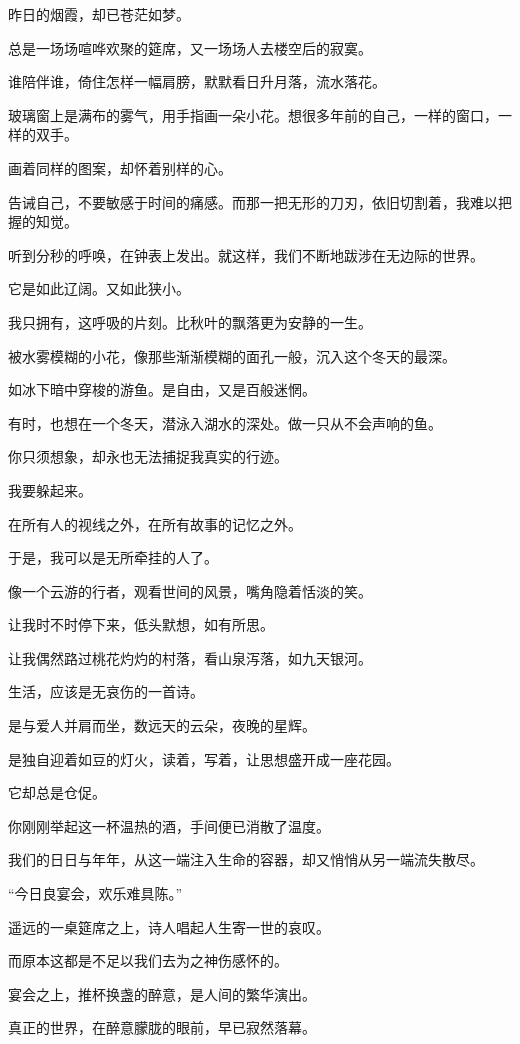 \documentclass[12pt,a4paper]{article}
\begin{document}
		昨日的烟霞，却已苍茫如梦。

		总是一场场喧哗欢聚的筵席，又一场场人去楼空后的寂寞。\par
		谁陪伴谁，倚住怎样一幅肩膀，默默看日升月落，流水落花。

		玻璃窗上是满布的雾气，用手指画一朵小花。想很多年前的自己，一样的窗口，一样的双手。\par
		画着同样的图案，却怀着别样的心。\par
		告诫自己，不要敏感于时间的痛感。而那一把无形的刀刃，依旧切割着，我难以把握的知觉。\par
		听到分秒的呼唤，在钟表上发出。就这样，我们不断地跋涉在无边际的世界。\par
		它是如此辽阔。又如此狭小。\par
		我只拥有，这呼吸的片刻。比秋叶的飘落更为安静的一生。

		被水雾模糊的小花，像那些渐渐模糊的面孔一般，沉入这个冬天的最深。\par
		如冰下暗中穿梭的游鱼。是自由，又是百般迷惘。\par
		有时，也想在一个冬天，潜泳入湖水的深处。做一只从不会声响的鱼。\par
		你只须想象，却永也无法捕捉我真实的行迹。\par
		我要躲起来。\par
		在所有人的视线之外，在所有故事的记忆之外。

		于是，我可以是无所牵挂的人了。

		像一个云游的行者，观看世间的风景，嘴角隐着恬淡的笑。\par
		让我时不时停下来，低头默想，如有所思。\par
		让我偶然路过桃花灼灼的村落，看山泉泻落，如九天银河。

		生活，应该是无哀伤的一首诗。\par
		是与爱人并肩而坐，数远天的云朵，夜晚的星辉。\par
		是独自迎着如豆的灯火，读着，写着，让思想盛开成一座花园。\par
		它却总是仓促。\par
		你刚刚举起这一杯温热的酒，手间便已消散了温度。\par
		我们的日日与年年，从这一端注入生命的容器，却又悄悄从另一端流失散尽。

		“今日良宴会，欢乐难具陈。”

		遥远的一桌筵席之上，诗人唱起人生寄一世的哀叹。\par
		而原本这都是不足以我们去为之神伤感怀的。\par
		宴会之上，推杯换盏的醉意，是人间的繁华演出。\par
		真正的世界，在醉意朦胧的眼前，早已寂然落幕。
\end{document}
